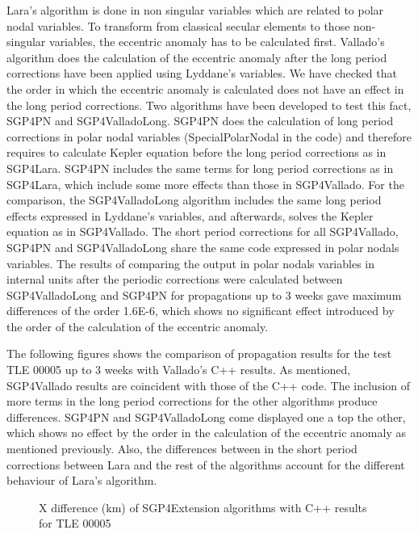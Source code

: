 \documentclass{article}
\begin{document}
Lara's algorithm is done in non singular variables which are related to polar nodal variables.
To transform from classical secular elements to those non-singular variables, the eccentric anomaly has to be calculated first.
Vallado's algorithm does the calculation of the eccentric anomaly after the long period corrections have been applied using Lyddane's variables.
We have checked that the order in which the eccentric anomaly is calculated does not have an effect in the long period corrections.
Two algorithms have been developed to test this fact, SGP4PN and SGP4ValladoLong.
SGP4PN does the calculation of long period corrections in polar nodal variables (SpecialPolarNodal in the code) and therefore requires
to calculate Kepler equation before the long period corrections as in SGP4Lara. SGP4PN includes the same terms for long period corrections as in SGP4Lara,
which include some more effects than those in SGP4Vallado. For the comparison, the SGP4ValladoLong algorithm includes the same long period effects expressed
in Lyddane's variables, and afterwards, solves the Kepler equation as in SGP4Vallado.
The short period corrections for all SGP4Vallado, SGP4PN and SGP4ValladoLong share the same code expressed in polar nodals variables.
The results of comparing the output in polar nodals variables in internal units after the periodic corrections were calculated between SGP4ValladoLong and SGP4PN for propagations up to 3 weeks
gave maximum differences of the order 1.6E-6, which shows no significant effect introduced by the order of the calculation of the eccentric anomaly.

The following figures shows the comparison of propagation results for the test TLE 00005 up to 3 weeks with Vallado's C++ results.
As mentioned, SGP4Vallado results are coincident with those of the C++ code.
The inclusion of more terms in the long period corrections for the other algorithms produce differences.
SGP4PN and SGP4ValladoLong come displayed one a top the other, which shows no effect by the order in the calculation of the eccentric anomaly as mentioned previously.
Also, the differences between in the short period corrections between Lara and the rest of the algorithms account for the different behaviour of Lara's algorithm.


\begin{figure}
    
    \label{fig:dx}
    \caption{X difference (km) of SGP4Extension algorithms with C++ results for TLE 00005}
\end{figure}
\end{document}
